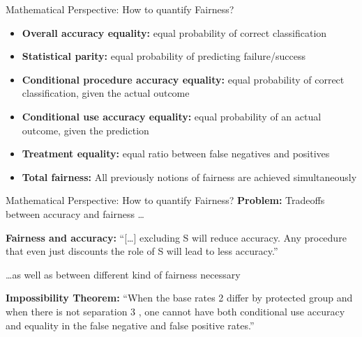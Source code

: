 \begin{frame}{Mathematical Perspective: How to quantify Fairness? \cite{Berk.2018}}
    
    \begin{itemize}
        \item \textbf{Overall accuracy equality:} equal probability of correct classification 
        \item \textbf{Statistical parity:} equal probability of predicting failure/success 
        \item \textbf{Conditional procedure accuracy equality:} equal probability of correct 
        classification, given the actual outcome
        \item \textbf{Conditional use accuracy equality:} equal probability of an actual 
        outcome, given the prediction
        \item \textbf{Treatment equality:} equal ratio between false negatives and positives
        \item \textbf{Total fairness:} All previously notions of fairness are achieved 
        simultaneously
    \end{itemize}
\end{frame}

\begin{frame}{Mathematical Perspective: How to quantify Fairness? \cite{Berk.2018}}
    \textbf{Problem:} Tradeoffs between accuracy and fairness \dots 

\begin{block}{\textbf{Fairness and accuracy:}\cite{Berk.2018}}
    \enquote{[\dots] excluding S will reduce accuracy. Any procedure that even just discounts the role of S will lead to less accuracy.}
\end{block}

\dots as well as between different kind of fairness necessary 

\begin{block}{\textbf{Impossibility Theorem:}\cite{Chouldechova2017FairPW, 
DBLP:journals/corr/KleinbergMR16}}
    \enquote{When the base rates 2 differ by protected group and when there is not separation 3 , one cannot have both conditional use accuracy and equality in the false negative and false positive rates.}
\end{block}

\end{frame}


